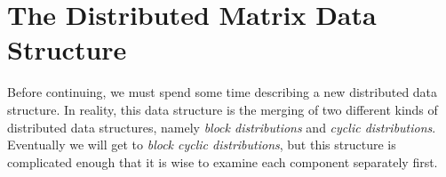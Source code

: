 \chapter[DMAT]{The Distributed Matrix Data Structure}
\label{chap:dmat}


\vspace{0.5cm}


Before continuing, we must spend some time describing a new distributed data 
structure.  In reality, this data structure is the merging of two different 
kinds of distributed data structures, namely \emph{block distributions} and 
\emph{cyclic distributions}.  Eventually we will get to \emph{block cyclic 
distributions}, but this structure is complicated enough that it is wise to 
examine each component separately first.

